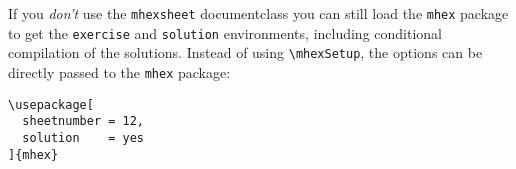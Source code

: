 \documentclass{scrartcl}
\begin{document}
If you \emph{don't} use the \verb|mhexsheet| documentclass you can still load the \verb|mhex| package to get the \verb|exercise| and \verb|solution| environments, including conditional compilation of the solutions. Instead of using \verb|\mhexSetup|, the options can be directly passed to the \verb|mhex| package:
\begin{verbatim}
\usepackage[
  sheetnumber = 12,
  solution    = yes
]{mhex}
\end{verbatim}
\begin{exercise}[points=2]
\end{exercise}

\begin{solution}
\end{solution}
\end{document}
